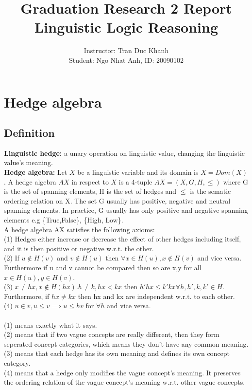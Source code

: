 \documentclass[26pt,fleqn,]{article}
\date{}
\title{Graduation Research 2 Report\\
Linguistic Logic Reasoning}
\author{Instructor: Tran Duc Khanh\\Student: Ngo Nhat Anh, ID: 20090102\\}
\begin{document}
\maketitle
%
%
\section{Hedge algebra}
\subsection{Definition}
{\bfseries Linguistic hedge:} a unary operation on linguistic value, changing the linguistic value's meaning.
\\
{\bfseries Hedge algebra:} Let \(X\) be a linguistic variable and its domain is \(X = Dom(X)\). A hedge 
algebra \(AX\) in respect to \(X\) is a 4-tuple \(AX = (X,G,H,\le)\) where G is the set of spanning
elements, H is the set of hedges and \(\le\) is the sematic ordering relation on X.
The set G usually has positive, negative and neutral spanning elements. In practice, G usually has only
positive and negative spanning elements e.g \{True,False\}, \{High, Low\}.\\

A hedge algebra AX satisfies the following  axioms:\\
{\indent
	(1) Hedges either increase or decrease the effect of other hedges including itself, and it is 
then positive or negative w.r.t. the other.\\}
{\indent
	(2) If \(u\notin H(v)\) and \(v\notin H(u)\) then \(\forall x\in H(u), x\notin H(v)\) and vice versa. 
	Furthermore if u and v cannot be compared then so are x,y for all \(x\in H(u), y\in H(v)\).
}\\
{\indent
	(3) \(x \not = hx, x \notin H(hx). h\neq k, hx<kx\) then \(h'hx\le k'kx\forall h,h',k,k'\in
	H.\) Furthermore, if \(hx \neq kx\) then hx and kx are independent w.r.t. to each other.
}\\
{\indent
	(4) \(u \in v, u \le v\implies u\le hv\) for \(\forall h\) and vice versa.
}
\\\\
(1) means exactly what it says.\\
(2) means that if two vague concepts are really different, then they form seperated concept categories,
which means they don't have any common meaning.\\
(3) means that each hedge has its own meaning and defines its own concept category.\\
(4) means that a hedge only modifies the vague concept's meaning. It preserves the ordering relation
of the vague concept's meaning w.r.t. other vague concepts.\\
\end{document}
